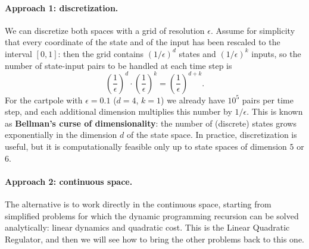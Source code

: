 \documentclass[10pt, a4paper]{report}
\begin{document}
\paragraph{Approach 1: discretization.} We can discretize both spaces with a grid of resolution $\epsilon$. Assume for simplicity that every coordinate of the state and of the input has been rescaled to the interval $[0,1]$: then the grid contains $(1/\epsilon)^d$ states and $(1/\epsilon)^k$ inputs, so the number of state-input pairs to be handled at each time step is\begin{equation}
    \left(\frac{1}{\epsilon}\right)^d\cdot\left(\frac{1}{\epsilon}\right)^k=\left(\frac{1}{\epsilon}\right)^{d+k}.
\end{equation}
For the cartpole with $\epsilon=0.1$ ($d=4$, $k=1$) we already have $10^5$ pairs per time step, and each additional dimension multiplies this number by $1/\epsilon$. This is known as \textbf{Bellman's curse of dimensionality}: the number of (discrete) states grows exponentially in the dimension $d$ of the state space. In practice, discretization is useful, but it is computationally feasible only up to state spaces of dimension $5$ or $6$.

\paragraph{Approach 2: continuous space.} The alternative is to work directly in the continuous space, starting from simplified problems for which the dynamic programming recursion can be solved analytically: linear dynamics and quadratic cost. This is the Linear Quadratic Regulator, and then we will see how to bring the other problems back to this one.
\end{document}
